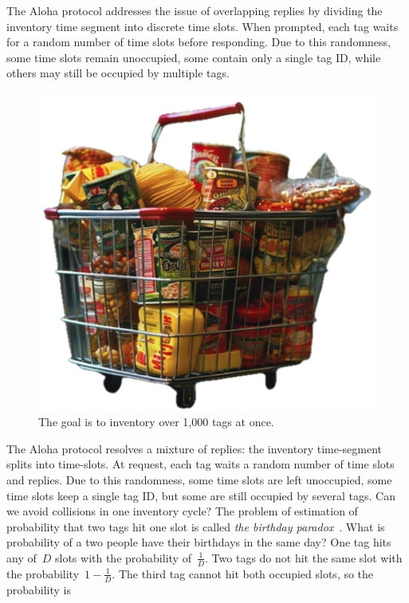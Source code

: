 \documentclass[12pt]{article}
\begin{document}
The Aloha protocol addresses the issue of overlapping replies by dividing the inventory time segment into discrete time slots. When prompted, each tag waits for a random number of time slots before responding. Due to this randomness, some time slots remain unoccupied, some contain only a single tag ID, while others may still be occupied by multiple tags.
\begin{figure}  %
\centering
\includegraphics[width=\linewidth]{fig_shopping-cart}
\caption{The goal is to inventory over 1,000 tags at once.}
\label{fig:pr_p0}
\end{figure}
The Aloha protocol resolves a mixture of replies: the inventory time-segment splits into time-slots.  At request, each tag waits a random number of time slots and replies. 
Due to this randomness, some  time slots are left  unoccupied, some time slots keep a single tag ID, but some are still occupied by several tags.  Can we avoid collisions in one inventory cycle? The problem of estimation of probability that two tags hit one slot is called \emph{the birthday paradox}~\cite{Santos2015,Mosteller1962}. What is probability of a two people have their birthdays in the same day? One tag hits any of~$D$ slots with the probability of~$\frac{1}{D}$. Two tags do not hit the same slot with the probability~$1-\frac{1}{D}$. The third tag cannot hit both occupied slots, so the probability is
\end{document}
